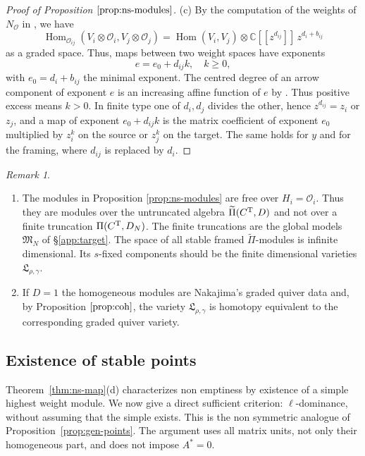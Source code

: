\documentclass[11pt,reqno]{amsart}
\theoremstyle{definition}
\theoremstyle{remark}
\newtheorem{Remark}[Theorem]{Remark}
\def\bbC{\mathbb C}
\providecommand{\calO}{\mathcal O}
\def\Hom{\operatorname{Hom}}
\newcommand{\llb}{[\![}
\newcommand{\rrb}{]\!]}
\begin{document}
\begin{proof}[Proof of Proposition $\ref{prop:ns-modules}$]
(c) By the computation of the weights of $N_\calO$ in \cite[(3.1.3), (3.1.5)]{VVsh}, \cite[\S2]{NW23} we have
$$\Hom_{\calO_{ij}}(V_i\otimes\calO_i,V_j\otimes\calO_j)=\Hom(V_i,V_j)\otimes\bbC\llb z^{d_{ij}}\rrb\,z^{d_i+b_{ij}}$$ 
as a graded space. Thus, maps between two weight spaces have exponents
$$e=e_0+d_{ij}k,\quad k\geqslant0,$$ 
with $e_0=d_i+b_{ij}$ the minimal exponent. The centred degree of an arrow component of exponent $e$ is an increasing affine function of $e$ 
by \cite[(3.1.5), (3.1.6)]{VVsh}. Thus 
positive excess means $k>0$. In finite type one of $d_i,d_j$ divides the other, 
hence $z^{d_{ij}}=z_i$ or $z_j$, and a map of exponent
$e_0+d_{ij}k$ is the matrix coefficient of exponent $e_0$ multiplied by $z_i^k$ 
on the source or $z_j^k$ on the target. The same holds for $y$ and for the framing, where
$d_{ij}$ is replaced by $d_i$.
\end{proof}

\begin{Remark}\label{rem:ns-modules}\hfill
\begin{enumerate}[label=$\mathrm{(\alph*)}$,leftmargin=8mm]
\item The modules in Proposition \ref{prop:ns-modules} are free over $H_i=\calO_i$.
Thus they are modules over the untruncated algebra
$\widetilde\Pi(C^{\rm T},D)$ and not over a finite truncation
$\Pi(C^{\rm T},D_N)$.
The finite truncations are the global models $\mathfrak M_N$ of
\S\ref{app:target}. The space of all stable framed
$\widetilde\Pi$-modules is
infinite dimensional.
Its $s$-fixed components should be the finite dimensional
varieties $\mathfrak L_{\rho,\gamma}$.
\item If $D=1$ the homogeneous modules are Nakajima's graded quiver data and,
by Proposition \(\ref{prop:coh}\), the variety 
$\mathfrak L_{\rho,\gamma}$ is homotopy equivalent to the corresponding graded quiver variety.
\end{enumerate}
\end{Remark}

\subsection{Existence of stable points}\label{subsec:ns-existence}
Theorem~\ref{thm:ns-map}(d) characterizes non emptiness by existence
of a simple highest weight module. We now give a direct sufficient
criterion: $\ell$-dominance, without assuming that the simple exists.
This is the non symmetric analogue of Proposition~\ref{prop:gen-points}.
The argument uses all matrix units, not only their homogeneous part,
and does not impose $A^*=0$.
\end{document}
